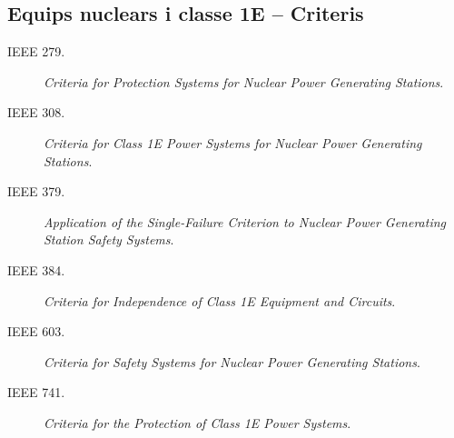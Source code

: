 \subsection*{Equips nuclears i classe 1E -- Criteris} 
\begin{description}
    \item [\hspace{5mm}IEEE 279.] \textit{Criteria for Protection Systems for Nuclear Power Generating Stations}.
    \item [\hspace{5mm}IEEE 308.] \textit{Criteria for Class 1E Power Systems for Nuclear Power Generating Stations}.
    \item [\hspace{5mm}IEEE 379.] \textit{Application of the Single-Failure Criterion to Nuclear Power Generating Station Safety Systems}.
    \item [\hspace{5mm}IEEE 384.] \textit{Criteria for Independence of Class 1E Equipment and Circuits}.
    \item [\hspace{5mm}IEEE 603.] \textit{Criteria for Safety Systems for Nuclear Power Generating Stations}.
    \item [\hspace{5mm}IEEE 741.] \textit{Criteria for the Protection of Class 1E Power Systems}.
\end{description}


